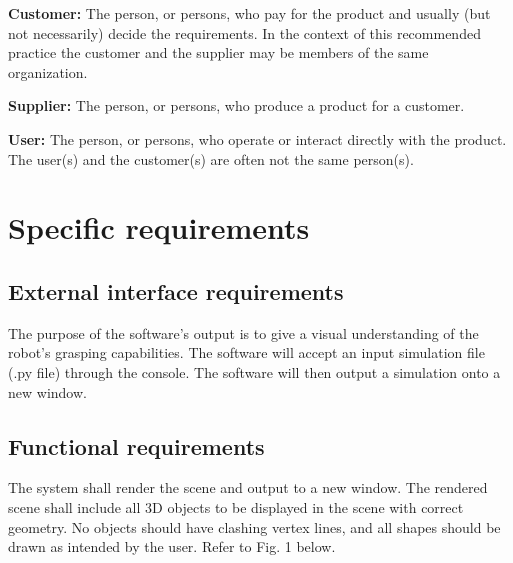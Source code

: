 \documentclass[10pt,journal,compsoc]{IEEEtran}
\begin{document}
\begin{flushleft}
\vspace{3mm}
\textbf{Customer:}
The person, or persons, who pay for the product and usually (but not necessarily) decide the requirements. In the context of this recommended practice the customer and the supplier may be members of the same organization.

\vspace{3mm}
\textbf{Supplier:}
The person, or persons, who produce a product for a customer.

\vspace{3mm}
\textbf{User:}
The person, or persons, who operate or interact directly with the product. The user(s) and the customer(s) are often not the same person(s).

\newpage

\section{Specific requirements}
\vspace{3mm}

\subsection{External interface requirements}
\vspace{3mm}
The purpose of the software's output is to give a visual understanding of the robot's grasping capabilities.
The software will accept an input simulation file (.py file) through the console.
The software will then output a simulation onto a new window.

\subsection{Functional requirements}
\vspace{3mm}
The system shall render the scene and output to a new window.
The rendered scene shall include all 3D objects to be displayed in the scene with correct geometry.
No objects should have clashing vertex lines, and all shapes should be drawn as intended by the user.
Refer to Fig. 1 below.


\end{flushleft}
\end{document}
